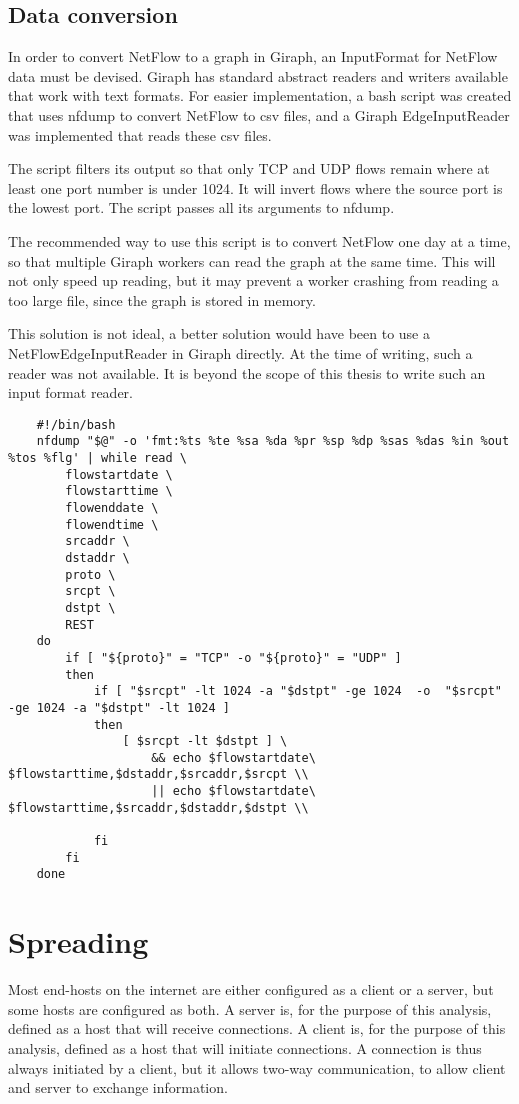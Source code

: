\subsection{Data conversion}
In order to convert NetFlow to a graph in Giraph,
 an InputFormat for NetFlow data must be devised.
Giraph has standard abstract readers and writers available that work with text formats.
For easier implementation, a \gls{bash} script was created that uses \gls{nfdump} to convert NetFlow to \gls{csv} files,
 and a Giraph EdgeInputReader was implemented that reads these \gls{csv} files.

The script filters its output so that only TCP and UDP flows remain where at least one port number is under 1024.
It will invert flows where the source port is the lowest port.
The script passes all its arguments to \gls{nfdump}.

The recommended way to use this script is to convert NetFlow one day at a time,
 so that multiple Giraph workers can read the graph at the same time.
This will not only speed up reading, but it may prevent a worker crashing from reading a too large file, since the graph is stored in memory.

This solution is not ideal, a better solution would have been to use a NetFlowEdgeInputReader in Giraph directly.
At the time of writing, such a reader was not available.
It is beyond the scope of this thesis to write such an input format reader.

\begin{landscape}
\begin{verbatim}
	#!/bin/bash
	nfdump "$@" -o 'fmt:%ts %te %sa %da %pr %sp %dp %sas %das %in %out %tos %flg' | while read \
	    flowstartdate \
	    flowstarttime \
	    flowenddate \
	    flowendtime \
	    srcaddr \
	    dstaddr \
	    proto \
	    srcpt \
	    dstpt \
	    REST
	do
	    if [ "${proto}" = "TCP" -o "${proto}" = "UDP" ]
	    then
	        if [ "$srcpt" -lt 1024 -a "$dstpt" -ge 1024  -o  "$srcpt" -ge 1024 -a "$dstpt" -lt 1024 ]
	        then
	            [ $srcpt -lt $dstpt ] \
	                && echo $flowstartdate\ $flowstarttime,$dstaddr,$srcaddr,$srcpt \\
	                || echo $flowstartdate\ $flowstarttime,$srcaddr,$dstaddr,$dstpt \\

	        fi
	    fi
	done
\end{verbatim}
\end{landscape}


\section{Spreading}
Most end-hosts on the internet are either configured as a client or a server, but some hosts are configured as both.
A server is, for the purpose of this analysis, defined as a host that will receive connections.
A client is, for the purpose of this analysis, defined as a host that will initiate connections.
A connection is thus always initiated by a client, but it allows two-way communication, to allow client and server to exchange information.

